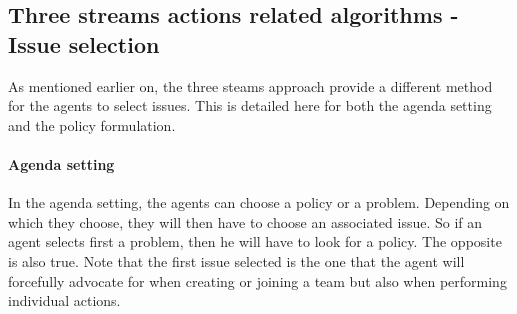 %	
%
%
%

\subsection{Three streams actions related algorithms - Issue selection}

As mentioned earlier on, the three steams approach provide a different method for the agents to select issues. This is detailed here for both the agenda setting and the policy formulation.

\paragraph{Agenda setting}

In the agenda setting, the agents can choose a policy or a problem. Depending on which they choose, they will then have to choose an associated issue. So if an agent selects first a problem, then he will have to look for a policy. The opposite is also true. Note that the first issue selected is the one that the agent will forcefully advocate for when creating or joining a team but also when performing individual actions.

